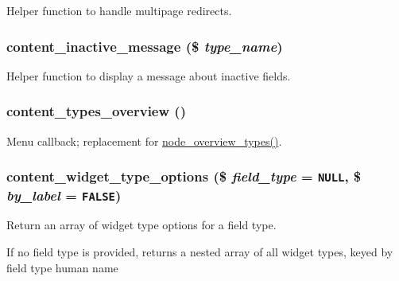 Helper function to handle multipage redirects. \hypertarget{content_8admin_8inc_69f92512e67ab69fcb28c5efabaa4fef}{
\subsubsection[{content\_\-inactive\_\-message}]{\setlength{\rightskip}{0pt plus 5cm}content\_\-inactive\_\-message (\$ {\em type\_\-name})}}
\label{content_8admin_8inc_69f92512e67ab69fcb28c5efabaa4fef}


Helper function to display a message about inactive fields. \hypertarget{content_8admin_8inc_403bc800fc53cc13cc91bbfb91c66796}{
\subsubsection[{content\_\-types\_\-overview}]{\setlength{\rightskip}{0pt plus 5cm}content\_\-types\_\-overview ()}}
\label{content_8admin_8inc_403bc800fc53cc13cc91bbfb91c66796}


Menu callback; replacement for \hyperlink{content__types_8inc_9530bf9d596b557e8c77f196960dde84}{node\_\-overview\_\-types()}. \hypertarget{content_8admin_8inc_3999076285d87f726deafe9b22413b11}{
\subsubsection[{content\_\-widget\_\-type\_\-options}]{\setlength{\rightskip}{0pt plus 5cm}content\_\-widget\_\-type\_\-options (\$ {\em field\_\-type} = {\tt NULL}, \/  \$ {\em by\_\-label} = {\tt FALSE})}}
\label{content_8admin_8inc_3999076285d87f726deafe9b22413b11}


Return an array of widget type options for a field type.

If no field type is provided, returns a nested array of all widget types, keyed by field type human name 